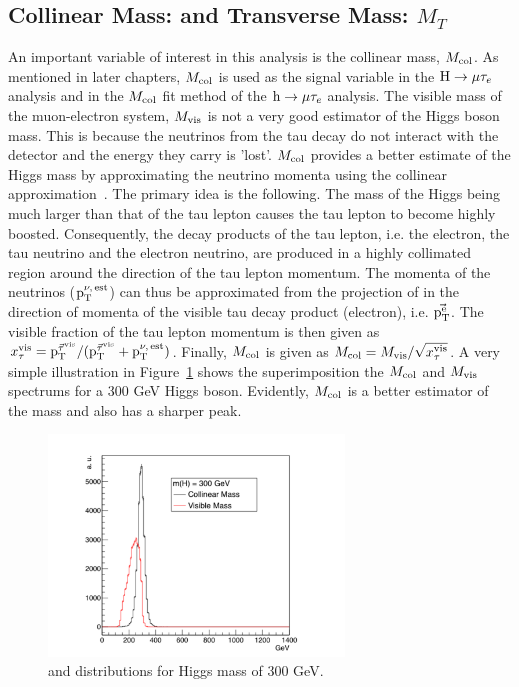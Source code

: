 \subsection{Collinear Mass: \mcol and Transverse Mass: $M_{T}$}
An important variable of interest in this analysis is the collinear mass, $M_{\text{col}}$. As mentioned in later chapters, $M_{\text{col}}$ is used as the signal variable in the $\text{H} \to \mu \tau_{e}$ analysis and in the $M_{\text{col}}$ fit method of the $\text{h} \to \mu \tau_{e}$ analysis. The visible mass of the muon-electron system, $M_{\text{vis}}$ is not a very good estimator of the Higgs boson mass. This is because the neutrinos from the tau decay do not interact with the detector and the energy they carry is 'lost'. $M_{\text{col}}$ provides a better estimate of the Higgs mass by approximating the neutrino momenta using the collinear approximation~\cite{Ellis:1987xu}. The primary idea is the following. The mass of the Higgs being much larger than that of the tau lepton causes the tau lepton to become highly boosted. Consequently, the decay products of the tau lepton, i.e. the electron, the tau neutrino and the electron neutrino, are produced in a highly collimated region around the direction of the tau lepton momentum. The momenta of the neutrinos ($\text{p}_\text{T}^{\nu,\,\text{est}}$) can thus be approximated from the projection of \ptvecmiss in the direction of momenta of the visible tau decay product (electron), i.e. $\vec{\text{p}_\text{T}^{\text{e}}}$. The visible fraction of the tau lepton momentum is then given as $x_{\tau}^\text{vis}={\text{p}_\text{T}^{\vec{\tau}^{\text{vis}}}}/{(\text{p}_\text{T}^{\vec{\tau}^\text{vis}}+\text{p}_\text{T}^{\nu,\,\text{est}})}$. Finally, $M_{\text{col}}$ is given as $M_{\text{col}}= M_{\text{vis}} / \sqrt{\smash[b]{x_{\tau}^\text{vis}}}$. A very simple illustration in Figure~\ref{fig:mcol_v_mvis} shows the superimposition  the $M_{\text{col}}$ and $M_{\text{vis}}$ spectrums for a 300 GeV Higgs boson. Evidently, $M_{\text{col}}$ is a better estimator of the mass and also has a sharper peak.

\begin{figure}[!htpb]\centering
 \includegraphics[width=0.7\textwidth]{plots_and_figures/chapter4/mcol_v_mvis.pdf}
\caption{\mcol and \mvis distributions for Higgs mass of 300 GeV.}
 \label{fig:mcol_v_mvis}
\end{figure}


